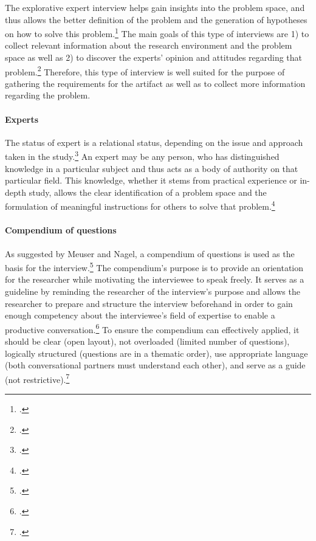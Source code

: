 The explorative expert interview helps gain insights into the problem space, and thus allows the better definition of the problem and the generation of hypotheses on how to solve this problem.\footcite[Cf.][p.28]{BognerInterviewsmitExperten2014} The main goals of this type of interviews are 1) to collect relevant information about the research environment and the problem space as well as 2) to discover the experts' opinion and attitudes regarding that problem.\footcite[Cf.][pp.28/29]{BognerInterviewsmitExperten2014} Therefore, this type of interview is well suited for the purpose of gathering the requirements for the artifact as well as to collect more information regarding the problem.

\paragraph{Experts} The status of expert is a relational status, depending on the issue and approach taken in the study.\footcites[Cf.][p.179]{Flickintroductionqualitativeresearch2009}[cf.][p.444]{MeuserExpertInneninterviewsvielfacherprobt1991} An expert may be any person, who has distinguished knowledge in a particular subject and thus acts as a body of authority on that particular field. This knowledge, whether it stems from practical experience or in-depth study, allows the clear identification of a problem space and the formulation of meaningful instructions for others to solve that problem.\footcites[Cf.][p.469]{MeuserExpertInneninterviewsvielfacherprobt1991}[cf.][p.467]{MeuserExperteninterviewkonzeptionelleGrundlagen2009}[cf.][p.179]{Flickintroductionqualitativeresearch2009}[cf.][p.451]{PfadenhauerExperteninterviewGesprachauf2007}[cf.][p.19]{BognerInterviewsmitExperten2014}

\paragraph{Compendium of questions} As suggested by Meuser and Nagel, a compendium of questions is used as the basis for the interview.\footcite[Cf.][p.472]{MeuserExperteninterviewkonzeptionelleGrundlagen2009} The compendium's purpose is to provide an orientation for the researcher while motivating the interviewee to speak freely. It serves as a guideline by reminding the researcher of the interview's purpose and allows the researcher to prepare and structure the interview beforehand in order to gain enough competency about the interviewee's field of expertise to enable a productive conversation.\footcites[Cf.][p.472 et seqq]{MeuserExperteninterviewkonzeptionelleGrundlagen2009}[cf.][p.133]{KrugerMethodennaturwissenschaftsdidaktischenForschung2014}[cf.][p.431 et seq]{BognerInterviewsmitExperten2014}[cf.][p.123 et seqq]{NiebertLeitfadengestutzteInterviews2014}[cf.][p.421]{AghamanoukjanQualitativeInterviews2007}
To ensure the compendium can effectively applied, it should be clear (open layout), not overloaded (limited number of questions), logically structured (questions are in a thematic order), use appropriate language (both conversational partners must understand each other), and serve as a guide (not restrictive).\footcite[Cf.][p.126]{NiebertLeitfadengestutzteInterviews2014}

